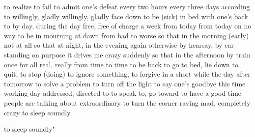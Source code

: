 {{{  
{to realize}
{to fail}
{to admit one’s defeat}
{every two hours}
{every three days}
{according to}
{willingly, gladly}
{willingly, gladly}
{face down}
{to be (sick) in bed}
{with one’s back to}
{by day, during the day}
{free, free of charge}
{a week from today}
{from today on}
{no way}
{to be in mourning}
{at dawn}
{from bad to worse}
{so that}
{in the morning (early)}
{not at all}
{so that}
{at night, in the evening}
{again}
{otherwise}
{by hearsay, by ear}
{standing}
{on purpose}
{it drives me crazy}
{suddenly}
{so that}
{in the afternoon}
{by train}
{once for all}
{real, really}
{from time to time}
{to be back}
{to go to bed, lie down}
{to quit, to stop (doing)}
{to ignore something, to forgive}
{in a short while}
{the day after tomorrow}
{to solve a problem}
{to turn off the light}
{to say one’s goodbye}
{this time}
{working day}
{addressed, directed to}
{to speak to, go toward}
{to have a good time}
{people are talking about}
{extraordinary}
{to turn the corner}
{raving mad, completely crazy}
{to sleep soundly}
{to sleep soundly"

}}}}
